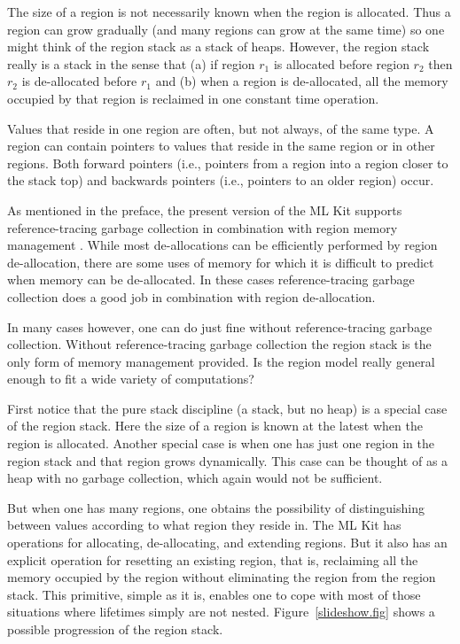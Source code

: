 \documentclass[12pt]{book}
\begin{document}
The size of a region 
%
is not necessarily known when the region is allocated.  Thus a region
can grow gradually (and many regions can grow at the same time) so one
might think of the region stack as a stack of heaps. However, the
region stack really is a stack in the sense that (a) if region $r_1$
is allocated before region $r_2$ then $r_2$ is de-allocated before
$r_1$ and (b) when a region is de-allocated, all the memory occupied
by that region is reclaimed in one constant time operation.

Values that reside in one region are often, but not always, of the
same type. A region can contain pointers to values that reside in the
same region or in other regions. Both forward pointers (i.e., pointers
from a region into a region closer to the stack top) and backwards
pointers (i.e., pointers to an older region) occur.

As mentioned in the preface, the present version of the ML Kit
supports reference-tracing 
%
garbage collection in combination with region memory management
\cite{hallenberg99}. While most de-allocations can be efficiently
performed by region de-allocation, there are some uses of memory for
which it is difficult to predict when memory can be de-allocated.  In
these cases reference-tracing garbage collection does a good job in
combination with region de-allocation.

In many cases however, one can do just fine without reference-tracing
garbage collection. Without reference-tracing garbage collection the
region stack is the only form of memory management provided. Is the
region model really general enough to fit a wide variety of
computations?

First notice that the pure 
%
stack discipline (a stack, but no heap) is a special case of the
region stack. Here the size of a region is known at the latest when
the region is allocated. Another special case is when one has just one
region in the region stack and that region grows dynamically.  This
case can be thought of as a 
%
heap with no garbage collection, which again would not be sufficient.

But when one has many regions, one obtains the possibility of
distinguishing between values according to what region they reside in.
The ML Kit has operations for allocating, de-allocating, and extending
regions. But it also has an explicit operation for
%
resetting an existing region, that is, reclaiming all the memory
occupied by the region without eliminating the region from the region
stack.  This primitive, simple as it is, enables one to cope with most
of those situations where lifetimes simply are not nested.
Figure~\ref{slideshow.fig} shows a possible progression of the region
stack.
\end{document}
